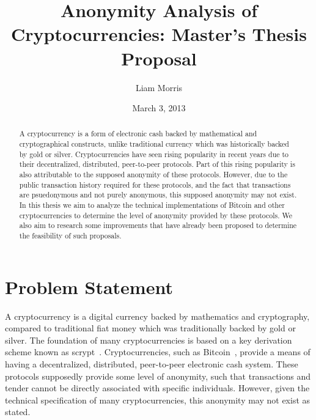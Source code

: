 \documentclass[11pt]{article}
\begin{document}
\nocite{*}
\begin{titlepage}
\title{Anonymity Analysis of Cryptocurrencies: Master's Thesis Proposal}
\author{Liam Morris \\
  }
\date{March 3, 2013}
\end{titlepage}
\maketitle
\vspace{6em}
\begin{abstract}
A cryptocurrency is a form of electronic cash backed by mathematical and
cryptographical constructs, unlike traditional currency which was historically
backed by gold or silver. Cryptocurrencies have seen rising popularity in recent
years due to their decentralized, distributed, peer-to-peer protocols. Part of
this rising popularity is also attributable to the supposed anonymity of these
protocols. However, due to the public transaction history required for these
protocols, and the fact that transactions are psuedonymous and not purely
anonymous, this supposed anonymity may not exist. In this thesis we aim to
analyze the technical implementations of Bitcoin and other cryptocurrencies to
determine the level of anonymity provided by these protocols. We also aim to
research some improvements that have already been proposed to determine the
feasibility of such proposals.
\end{abstract}
\thispagestyle{empty}
\clearpage
{}
\tableofcontents
\listoffigures
\pagebreak
\section{Problem Statement}
A cryptocurrency is a digital currency backed by mathematics and
cryptography, compared to traditional fiat money which was traditionally backed by gold
or silver. The foundation of many cryptocurrencies is based on a key derivation
scheme known as scrypt~\cite{Percival}.
Cryptocurrencies, such as Bitcoin~\cite{Nakamoto08}, provide a means of having a
decentralized, distributed, peer-to-peer electronic cash system. These protocols
supposedly provide some level of anonymity, such that transactions and tender
cannot be directly associated with specific individuals. However, given the
technical specification of many cryptocurrencies, this anonymity may not exist
as stated.
\end{document}
